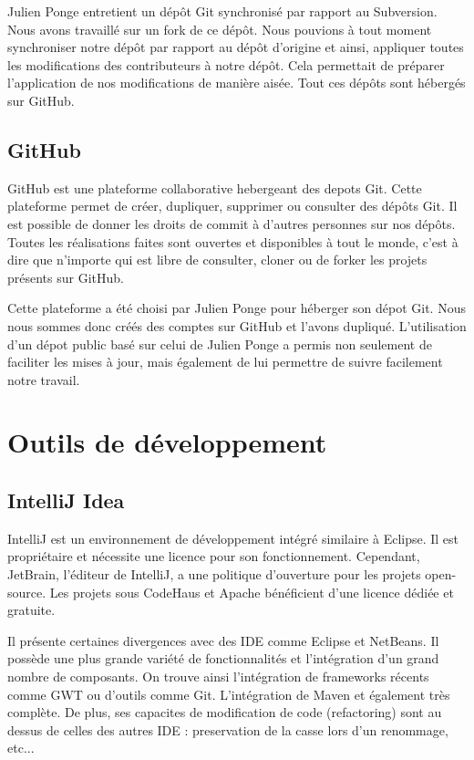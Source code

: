 Julien Ponge entretient un dépôt Git synchronisé par rapport au Subversion. Nous avons travaillé sur un fork de ce dépôt.
Nous pouvions à tout moment synchroniser notre dépôt par rapport au dépôt d'origine et ainsi, appliquer toutes les modifications des contributeurs à notre dépôt.
Cela permettait de préparer l'application de nos modifications de manière aisée. Tout ces dépôts sont hébergés sur GitHub.
\subsection{GitHub}
GitHub est une plateforme collaborative hebergeant des depots Git. Cette plateforme permet de créer, dupliquer, supprimer ou consulter des dépôts Git.
Il est possible de donner les droits de commit à d'autres personnes sur nos dépôts. Toutes les réalisations faites sont ouvertes et disponibles à tout le monde, c'est à dire que n'importe qui est libre de consulter, cloner ou de forker les projets présents sur GitHub.

Cette plateforme a été choisi par Julien Ponge pour héberger son dépot Git. Nous nous sommes donc créés des comptes sur GitHub et l'avons dupliqué. L'utilisation d'un dépot public basé sur celui de Julien Ponge a permis non seulement de faciliter les mises à jour, mais également de lui permettre de suivre facilement notre travail.




\section{Outils de développement}
\subsection{IntelliJ Idea}
IntelliJ est un environnement de développement intégré similaire à Eclipse. Il est propriétaire et nécessite une licence pour son fonctionnement. Cependant, JetBrain, l'éditeur de IntelliJ, a une politique d'ouverture pour les projets open-source. Les projets sous CodeHaus et Apache bénéficient d'une licence dédiée et gratuite. 

Il présente certaines divergences avec des IDE comme Eclipse et NetBeans. Il possède une plus grande variété de fonctionnalités et l'intégration d'un grand nombre de composants. On trouve ainsi l'intégration de frameworks récents comme GWT ou d'outils comme Git. L'intégration de Maven et également très complète.
De plus, ses capacites de modification de code (refactoring) sont au dessus de celles des autres IDE : preservation de la casse lors d'un renommage, etc...
